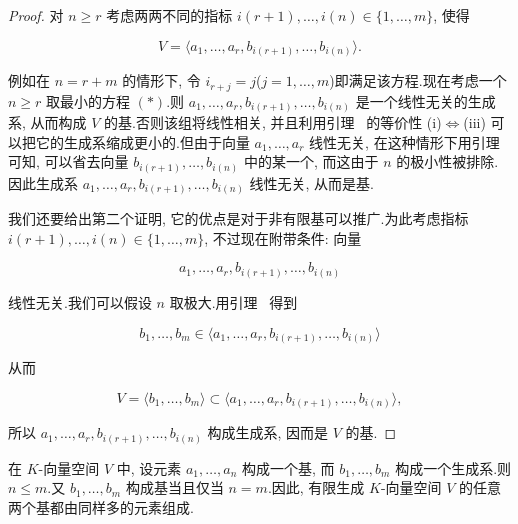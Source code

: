 \begin{proof}
对 $n \geq r$ 考虑两两不同的指标 $i(r + 1), \ldots, i(n) \in \{1, \ldots, m\}$, 使得

\begin{equation}
V = \langle a_1, \ldots, a_r, b_{i(r + 1)}, \ldots, b_{i(n)} \rangle. \tag{$(*)$}
\end{equation}

例如在 $n = r + m$ 的情形下, 令 $i_{r + j} = j$($j = 1, \ldots, m$)即满足该方程.现在考虑一个 $n \geq r$ 取最小的方程 $(*)$.则 $a_1, \ldots, a_r, b_{i(r + 1)}, \ldots, b_{i(n)}$ 是一个线性无关的生成系, 从而构成 $V$ 的基.否则该组将线性相关, 并且利用引理~ 的等价性 (i)$\Longleftrightarrow$(iii) 可以把它的生成系缩成更小的.但由于向量 $a_1, \ldots, a_r$ 线性无关, 在这种情形下用引理~ 可知, 可以省去向量 $b_{i(r + 1)}, \ldots, b_{i(n)}$ 中的某一个, 而这由于 $n$ 的极小性被排除.因此生成系 $a_1, \ldots, a_r, b_{i(r + 1)}, \ldots, b_{i(n)}$ 线性无关, 从而是基.

我们还要给出第二个证明, 它的优点是对于非有限基可以推广.为此考虑指标 $i(r + 1), \ldots, i(n) \in \{1, \ldots, m\}$, 不过现在附带条件: 向量

\[
a_1, \ldots, a_r, b_{i(r + 1)}, \ldots, b_{i(n)}
\]

线性无关.我们可以假设 $n$ 取极大.用引理~ 得到

\[
b_1, \ldots, b_m \in \langle a_1, \ldots, a_r, b_{i(r + 1)}, \ldots, b_{i(n)} \rangle
\]

从而

\[
V = \langle b_1, \ldots, b_m \rangle \subset \langle a_1, \ldots, a_r, b_{i(r + 1)}, \ldots, b_{i(n)} \rangle,
\]

所以 $a_1, \ldots, a_r, b_{i(r + 1)}, \ldots, b_{i(n)}$ 构成生成系, 因而是 $V$ 的基.
\end{proof}

\begin{bigtheorem}[基的长度]\label{bigthm:1.5.9}
在 $K$-向量空间 $V$ 中, 设元素 $a_1, \ldots, a_n$ 构成一个基, 而 $b_1, \ldots, b_m$ 构成一个生成系.则 $n \leq m$.又 $b_1, \ldots, b_m$ 构成基当且仅当 $n = m$.因此, 有限生成 $K$-向量空间 $V$ 的任意两个基都由同样多的元素组成.
\end{bigtheorem}

